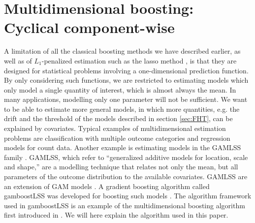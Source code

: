 \section{Multidimensional boosting: Cyclical component-wise}
A limitation of all the classical boosting methods we have described earlier, as well as of $L_1$-penalized estimation such as the lasso method \citep{lasso}, is that they are designed for statistical problems involving a one-dimensional prediction function. By only considering such functions, we are restricted to estimating models which only model a single quantity of interest, which is almost always the mean.
In many applications, modelling only one parameter will not be sufficient. We want to be able to estimate more general models, in which more quantities, e.g. the drift and the threshold of the models described in section \ref{sec:FHT}, can be explained by covariates. Typical examples of multidimensional estimation problems are classification with multiple outcome categories and regression models for count data. Another example is estimating models in the GAMLSS family \citep{gamlss}. GAMLSS, which refer to ``generalized additive models for location, scale and shape,'' are a modelling technique that relates not only the mean, but all parameters of the outcome distribution to the available covariates. GAMLSS are an extension of GAM models \citep{gam-book}. A gradient boosting algorithm called gamboostLSS was developed for boosting such models \citep{gamboostlss-paper}. The algorithm framework used in gamboostLSS is an example of the multidimensional boosting algorithm first introduced in \citet{schmid}. We will here explain the algorithm used in this paper.

